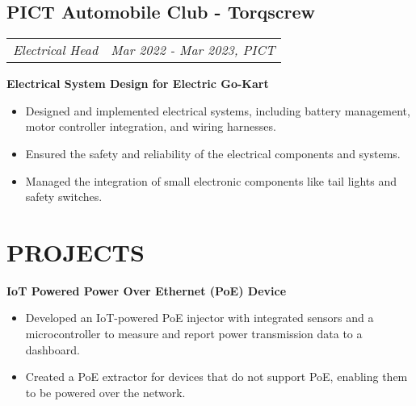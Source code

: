 \documentclass[10pt,a4paper,hidelinks,unicode]{moderncv}
\newcommand*{\experienceentry}[5][1.5mm]{
    \subsection{#2} \vspace{-1.5mm}
    \begin{tabularx}{\textwidth}{LR}
        {\itshape #3} & {\itshape #4, #5}
    \end{tabularx}
    \par\addvspace{#1}
}
\begin{document}
\begin{minipage}[t]{0.62\textwidth}
\experienceentry{PICT Automobile Club - Torqscrew}{Electrical Head}{Mar 2022 - Mar 2023}{PICT}

\textbf{Electrical System Design for Electric Go-Kart}
\begin{itemize}
    \item Designed and implemented electrical systems, including battery management, motor controller integration, and wiring harnesses.
    \item Ensured the safety and reliability of the electrical components and systems.
    \item Managed the integration of small electronic components like tail lights and safety switches.
\end{itemize}
\vspace{2.0mm}

\section{PROJECTS}

\textbf{IoT Powered Power Over Ethernet (PoE) Device}
\begin{itemize}
    \item Developed an IoT-powered PoE injector with integrated sensors and a microcontroller to measure and report power transmission data to a dashboard.
    \item Created a PoE extractor for devices that do not support PoE, enabling them to be powered over the network.
\end{itemize}
\vspace{2.0mm}

\end{minipage}
\hfill
\end{document}
